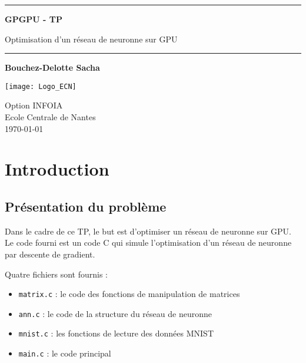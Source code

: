 \documentclass[12pt, a4paper]{article}
\begin{document}
\begin{titlepage}
   \begin{center}
       
       
       \begin{center}
      \rule{0.75\linewidth}{1pt}
      \end{center}
      \vspace*{1cm}
       \textbf{\LARGE GPGPU - TP}

       \vspace{0.5cm}
        \Large Optimisation d'un réseau de neuronne sur GPU \normalsize
        
       \begin{center}
      \rule{0.5\linewidth}{1pt}
      \end{center}
  
            
       \vspace{1.5cm}

       \textbf{Bouchez-Delotte Sacha}


            
       \vspace{9cm}
     
       \texttt{[image: Logo\_ECN]}
            
       Option INFOIA\\
       Ecole Centrale de Nantes\\
       \today
            
   \end{center}
\end{titlepage}


\tableofcontents

\newpage
\section{Introduction}

\subsection{Présentation du problème}

Dans le cadre de ce TP, le but est d'optimiser un réseau de neuronne sur GPU.
Le code fourni est un code C qui simule l'optimisation d'un réseau de neuronne par descente de gradient.

Quatre fichiers sont fournis :
\begin{itemize}
    \item \texttt{matrix.c} : le code des fonctions de manipulation de matrices
    \item \texttt{ann.c} : le code de la structure du réseau de neuronne
    \item \texttt{mnist.c} : les fonctions de lecture des données MNIST
    \item \texttt{main.c} : le code principal
\end{itemize}
\end{document}
